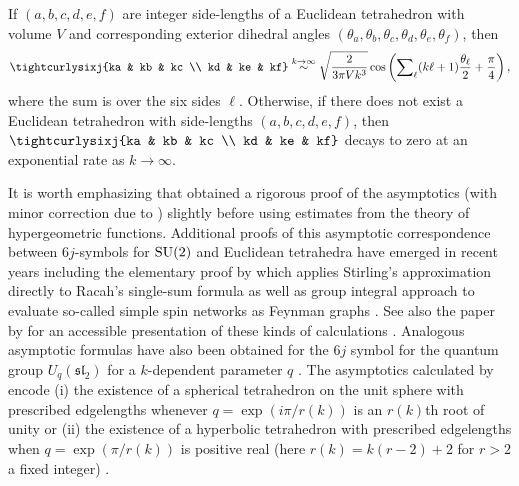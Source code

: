 \documentclass[notitlepage, 10pt]{article}
\begin{document}
\begin{thm}
    If $(a,b,c,d,e,f)$ are integer side-lengths of a Euclidean tetrahedron with volume $V$ and corresponding exterior dihedral angles $(\theta_a, \theta_b, \theta_c, \theta_d, \theta_e, \theta_f)$, then 
    \begin{equation*}
        \tightcurlysixj{ka & kb & kc \\ kd & ke & kf} \stackrel{k\to \infty}{\sim} \sqrt{\frac{2}{3 \pi V k^3}} \cos\left({\sum}_{\ell} (k \ell + 1) \frac{\theta_{\ell}}{2} + \frac{\pi}{4}\right),
    \end{equation*}
    where the sum is over the six sides $\ell$.
    Otherwise, if there does not exist a Euclidean tetrahedron with side-lengths $(a,b,c,d,e,f)$, then $\tightcurlysixj{ka & kb & kc \\ kd & ke & kf}$ decays to zero at an exponential rate as $k\to\infty$.
\end{thm}
It is worth emphasizing that \citeauthor{chen1999asymptotics} \cite{chen1999asymptotics} obtained a rigorous proof of the \citeauthor{ponzano1968semiclassical} asymptotics (with minor correction due to \cite{watson1999asymptotic}) slightly before \citeauthor{chen1999asymptotics} using estimates from the theory of hypergeometric functions.
Additional proofs of this asymptotic correspondence between $6j$-symbols for $\operatorname{SU}(2)$ and Euclidean tetrahedra have emerged in recent years including the elementary proof by \citeauthor{gurau2008ponzano} which applies Stirling's approximation directly to Racah's single-sum formula \cite{gurau2008ponzano} as well as group integral approach to evaluate so-called simple spin networks as Feynman graphs \cite{freidel2000simple,freidel2003asymptotics}.
See also the paper by \citeauthor{bartlett2023coherent} for an accessible presentation of these kinds of calculations \cite{bartlett2023coherent}.
Analogous asymptotic formulas have also been obtained for the $6j$ symbol for the quantum group $U_q(\mathfrak{sl}_2)$ for a $k$-dependent parameter $q$ \cite{taylor2006sixj}.
The asymptotics calculated by \citeauthor{taylor2006sixj} encode (i) the existence of a spherical tetrahedron on the unit sphere with prescribed edgelengths whenever $q=\exp(i\pi/r(k))$ is an $r(k)$th root of unity or (ii) the existence of a hyperbolic tetrahedron with prescribed edgelengths when $q=\exp(\pi/r(k))$ is positive real (here $r(k) = k(r-2) + 2$ for $r > 2$ a fixed integer) \cite{taylor2006sixj}.
\end{document}
